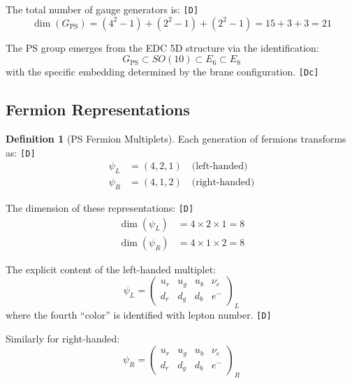 \documentclass[11pt,a4paper]{article}
\newcommand{\tagD}{\textcolor{green!50!black}{\texttt{[D]}}}
\newcommand{\tagDc}{\textcolor{blue!70!black}{\texttt{[Dc]}}}
\theoremstyle{definition}
\newtheorem{definition}{Definition}[section]
\begin{document}
The total number of gauge generators is: \tagD{}
\begin{equation}
\label{eq:generator-count}
\dim(G_{\text{PS}}) = (4^2 - 1) + (2^2 - 1) + (2^2 - 1) = 15 + 3 + 3 = 21
\end{equation}

\begin{derivbox}
The PS group emerges from the EDC 5D structure via the identification:
\begin{equation}
\label{eq:ps-from-5d}
G_{\text{PS}} \subset SO(10) \subset E_6 \subset E_8
\end{equation}
with the specific embedding determined by the brane configuration. \tagDc{}
\end{derivbox}

\subsection{Fermion Representations}
\label{subsec:fermion-reps}

\begin{definition}[PS Fermion Multiplets]
\label{def:fermion-reps}
Each generation of fermions transforms as: \tagD{}
\begin{align}
\label{eq:fermion-left}
\psi_L &= (4, 2, 1) \quad \text{(left-handed)} \\
\label{eq:fermion-right}
\psi_R &= (4, 1, 2) \quad \text{(right-handed)}
\end{align}
\end{definition}

The dimension of these representations: \tagD{}
\begin{align}
\label{eq:dim-left}
\dim(\psi_L) &= 4 \times 2 \times 1 = 8 \\
\label{eq:dim-right}
\dim(\psi_R) &= 4 \times 1 \times 2 = 8
\end{align}

The explicit content of the left-handed multiplet:
\begin{equation}
\label{eq:psi-left-explicit}
\psi_L = \begin{pmatrix}
u_r & u_g & u_b & \nu_e \\
d_r & d_g & d_b & e^-
\end{pmatrix}_L
\end{equation}
where the fourth ``color'' is identified with lepton number. \tagD{}

Similarly for right-handed:
\begin{equation}
\label{eq:psi-right-explicit}
\psi_R = \begin{pmatrix}
u_r & u_g & u_b & \nu_e \\
d_r & d_g & d_b & e^-
\end{pmatrix}_R
\end{equation}
\end{document}
